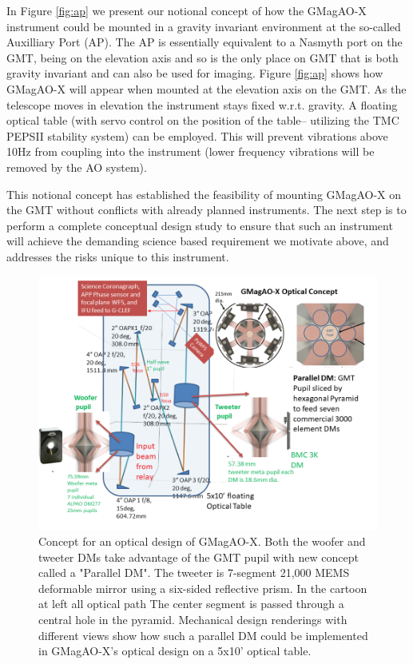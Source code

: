 \documentclass[12pt,preprint]{aastex}
\begin{document}
In Figure \ref{fig:ap} we present our notional concept of how the GMagAO-X instrument could be mounted in a gravity invariant environment at the so-called Auxilliary Port (AP). The AP is essentially equivalent to a Nasmyth port on the GMT, being on the elevation axis and so is the only place on GMT that is both gravity invariant and can also be used for imaging.  Figure \ref{fig:ap} shows how GMagAO-X will appear when mounted at the elevation axis on the GMT. As the telescope moves in elevation the instrument stays fixed w.r.t. gravity. A floating optical table (with servo control on the position of the table-- utilizing the TMC PEPSII stability system) can be employed.  This will prevent vibrations above 10Hz from coupling into the instrument (lower frequency vibrations will be removed by the AO system). 

This notional concept has established the feasibility of mounting GMagAO-X on the GMT without conflicts with already planned instruments.  The next step is to perform a complete conceptual design study to ensure that such an instrument will achieve the demanding science based requirement we motivate above, and addresses the risks unique to this instrument. 

\begin{figure} [h!]
\centering
\includegraphics[width=5in]{figures/Possible_Optical_design_GMagAOX_V2.png}
\vspace{-0.2in}
\caption{ Concept for an optical design of GMagAO-X. Both the woofer and tweeter DMs take advantage of the GMT pupil with new concept called a "Parallel DM". The tweeter is 7-segment 21,000 MEMS deformable mirror using a six-sided reflective prism.  In the cartoon at left all optical path The center segment is passed through a central hole in the pyramid. Mechanical design renderings with different views show how such a parallel DM could be implemented in GMagAO-X's optical design on a 5x10' optical table.  \label{fig:pardm}}
\vspace{-0.1in}
\end{figure}
\end{document}
